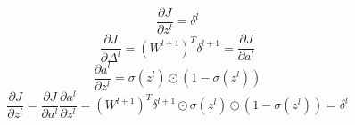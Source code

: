\documentclass{article}
\begin{document}
  \begin{equation}
    \frac{\partial J}{\partial z^l} = \delta^l
  \end{equation}
  \begin{equation}
    \frac{\partial J}{\partial \Delta^l} = (W^{l + 1})^T \delta^{l + 1} = \frac{\partial J}{\partial a^l}
  \end{equation}
  \begin{equation}
    \frac{\partial a^l}{\partial z^l} = \sigma(z^l) \odot (1 - \sigma(z^l))
  \end{equation}
  \begin{equation}
    \frac{\partial J}{\partial z^l} = \frac{\partial J}{\partial a^l} \frac{\partial a^l}{\partial z^l} = (W^{l + 1})^T \delta^{l + 1} \odot \sigma(z^l) \odot (1 - \sigma(z^l)) = \delta^l
  \end{equation}
\end{document}
